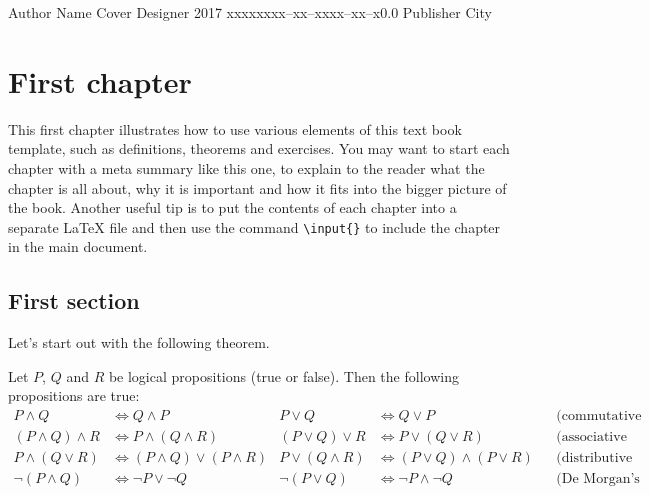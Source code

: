 \documentclass{tstextbook}
\begin{document}
	
	{Author Name}
	{Cover Designer}
	{2017}
	{xxxxx}{xxx--xx--xxxx--xx--x}{0.0}
	{Publisher}
	{City}
	
	
	\chapter{First chapter}
	
	\begin{summary}
		This first chapter illustrates how to use various elements of this
		text book template, such as definitions, theorems and exercises. You
		may want to start each chapter with a meta summary like this one, to
		explain to the reader what the chapter is all about, why it is
		important and how it fits into the bigger picture of the
		book. Another useful tip is to put the contents of each chapter into
		a separate \LaTeX{} file and then use the command
		\texttt{\textbackslash{}input\{\}} to include the chapter in the
		main document.
	\end{summary}
	
	\section{First section}
	
	Let's start out with the following theorem.
	
	\begin{theorem}
		\label{th:logicalgebra}
		Let $P$, $Q$ and $R$ be logical propositions (true or false).
		Then the following propositions are true:
		\small
		\begin{align*}
			P \land Q &\Leftrightarrow Q \land P &
			P \lor  Q &\Leftrightarrow Q \lor P  &&
			\text{(commutative laws)} \\
			(P \land Q) \land R &\Leftrightarrow P \land (Q \land R) &
			(P \lor Q)  \lor  R &\Leftrightarrow P \lor  (Q \lor  R) &&
			\text{(associative laws)} \\
			P \land (Q \lor  R) &\Leftrightarrow (P \land Q) \lor  (P \land R) &
			P \lor  (Q \land R) &\Leftrightarrow (P \lor  Q) \land (P \lor  R) &&
			\text{(distributive laws)} \\
			\lnot (P \land Q) &\Leftrightarrow \lnot P \lor  \lnot Q &
			\lnot (P \lor  Q) &\Leftrightarrow \lnot P \land \lnot Q &&
			\text{(De Morgan's laws)}
		\end{align*}
	\end{theorem}
	
\end{document}
